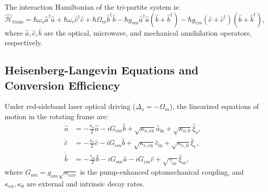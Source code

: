 The interaction Hamiltonian of the tri-partite system is:
\begin{equation}
    \hat{\mathcal{H}}_{\text{trans}} = \hbar \omega_o \hat{a}^\dagger \hat{a} + \hbar \omega_e \hat{c}^\dagger \hat{c} + \hbar \Omega_m \hat{b}^\dagger \hat{b} - \hbar g_{om} \hat{a}^\dagger \hat{a} (\hat{b} + \hat{b}^\dagger) - \hbar g_{em} (\hat{c} + \hat{c}^\dagger)(\hat{b} + \hat{b}^\dagger),
    \label{eq:transducer_hamiltonian_full}
\end{equation}
where $\hat{a}, \hat{c}, \hat{b}$ are the optical, microwave, and mechanical annihilation operators, respectively.

\subsection{Heisenberg-Langevin Equations and Conversion Efficiency}
Under red-sideband laser optical driving ($\Delta_o = -\Omega_m$), the linearized equations of motion in the rotating frame are:
\begin{align}
    \dot{\hat{a}} &= -\frac{\kappa_o}{2} \hat{a} - i G_{om} \hat{b} + \sqrt{\kappa_{o,\text{ex}}} \hat{a}_{\text{in}} + \sqrt{\kappa_{o,0}} \hat{\xi}_o, \label{eq:langevin_optical} \\
    \dot{\hat{c}} &= -\frac{\kappa_e}{2} \hat{c} - i G_{em} \hat{b} + \sqrt{\kappa_{e,\text{ex}}} \hat{c}_{\text{in}} + \sqrt{\kappa_{e,0}} \hat{\xi}_e, \label{eq:langevin_microwave} \\
    \dot{\hat{b}} &= -\frac{\gamma_m}{2} \hat{b} - i G_{om} \hat{a} - i G_{em} \hat{c} + \sqrt{\gamma_m} \hat{\xi}_m, \label{eq:langevin_mechanical}
\end{align}
where $G_{om} = g_{om} \sqrt{n_{\text{cav}}}$ is the pump-enhanced optomechanical coupling, and $\kappa_{\text{ex}}, \kappa_0$ are external and intrinsic decay rates.

